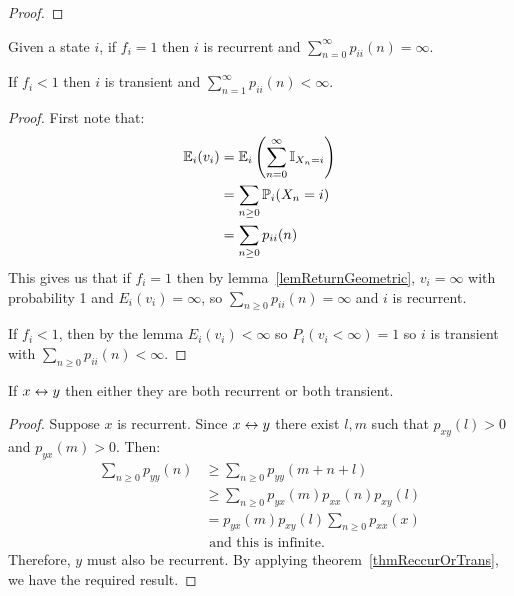 \documentclass[../Main.tex]{subfiles}
\begin{document}
\begin{proof}
\end{proof}
\begin{theorem}
    Given a state $i$, if $f_i = 1$ then $i$ is recurrent and $\sum_{n=0}^{\infty} p_{ii}(n) = \infty$.

    If $f_i < 1$ then $i$ is transient and $\sum_{n=1}^{\infty} p_{ii}(n) < \infty$.
    \label{thmReccurOrTrans}
\end{theorem}
\begin{proof}
    First note that:
    \begin{align*}
        \mathbb{E}_i(v_i) &= \mathbb{E}_i \left(\sum_{n=0}^{\infty} \mathbb{I}_{X_n = i}\right) \\
        &= \sum_{n \geq 0} \mathbb{P}_i(X_n = i) \\
        &= \sum_{n \geq 0} p_{ii}(n)
    \end{align*}
    This gives us that if $f_i = 1$ then by lemma~\ref{lemReturnGeometric}, $v_i = \infty$ with probability 1 and $E_i(v_i) = \infty$, so $\sum_{n\geq 0} p_{ii}(n) = \infty$ and $i$ is recurrent.

    If $f_i < 1$, then by the lemma $E_i(v_i) < \infty$ so $P_i(v_i < \infty) = 1$ so $i$ is transient with $\sum_{n \geq 0} p_{ii}(n) < \infty$.
\end{proof}
\begin{theorem}
    If $x \leftrightarrow y$ then either they are both recurrent or both transient.
    \label{thmRecurrenceCommunicates}
\end{theorem}
\begin{proof}
    Suppose $x$ is recurrent. Since $x \leftrightarrow y$ there exist $l, m$ such that $p_{xy}(l) > 0$ and $p_{yx}(m) > 0$. Then:
    \begin{align*}
        \sum_{n \geq 0} p_{yy}(n) &\geq \sum_{n \geq 0} p_{yy}(m + n + l) \\
        &\geq \sum_{n \geq 0}p_{yx}(m) p_{xx}(n) p_{xy}(l) \\
        &= p_{yx}(m) p_{xy}(l)\sum_{n \geq 0} p_{xx}(x) \\ 
        &\text{ and this is infinite.}
    \end{align*}
    Therefore, $y$ must also be recurrent. By applying theorem~\ref{thmReccurOrTrans}, we have the required result.
\end{proof}
\end{document}
